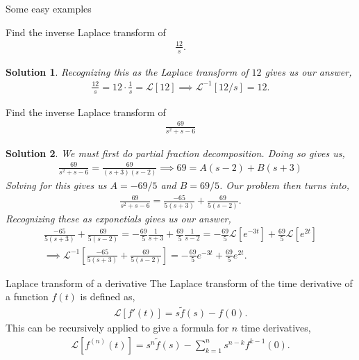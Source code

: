 \documentclass[11pt]{article}
\newtheorem*{solution}{Solution}
\theoremstyle{mystyle}
\begin{document}
\begin{psexample}{Some easy examples}{}
    \begin{hwproblem}
        Find the inverse Laplace transform of
        \begin{align*}
            \frac{12}{s}.
        \end{align*}
    \end{hwproblem}
    \begin{solution}
        Recognizing this as the Laplace transform of
        $12$ gives us our answer,
        \begin{align*}
            \frac{12}{s} = 12 \cdot \frac{1}{s} = \mathcal{L}[12] \implies \mathcal{L}^{-1}[12/s] = 12.
        \end{align*}
    \end{solution}
    \begin{hwproblem}
        Find the inverse Laplace transform of
        \begin{align*}
            \frac{69}{s^2 + s - 6}
        \end{align*}
    \end{hwproblem}
    \begin{solution}
        We must first do partial fraction decomposition.
        Doing so gives us,
        \begin{align*}
            \frac{69}{s^2 + s - 6} = \frac{69}{(s + 3)(s - 2)} \implies 69 = A(s - 2) + B(s + 3)
        \end{align*}
        Solving for this gives us $A = -69/5$ and $B = 69/5$.
        Our problem then turns into,
        \begin{align*}
            \frac{69}{s^2 + s - 6} = \frac{-65}{5(s + 3)} + \frac{69}{5(s - 2)}.
        \end{align*}
        Recognizing these as exponetials gives us our answer,
        \begin{align*}
            \frac{-65}{5(s + 3)} + \frac{69}{5(s - 2)} = - \frac{69}{5} \frac{1}{s + 3} + \frac{69}{5} \frac{1}{s - 2} = - \frac{69}{5} \mathcal{L}[e^{-3t}] + \frac{69}{5} \mathcal{L}[e^{2t}]\\
            \implies
            \mathcal{L}^{-1}\left[ \frac{-65}{5(s + 3)} + \frac{69}{5(s - 2)} \right] = - \frac{69}{5} e^{-3t} + \frac{69}{5} e^{2t}.
        \end{align*}
    \end{solution}
\end{psexample}

\begin{psidea}{Laplace transform of a derivative}{}
    The Laplace transform of the time derivative
    of a function $f(t)$ is defined as,
    \begin{align*}
        \mathcal{L}[f'(t)] = s\tilde{f}(s) - f(0).
    \end{align*}
    This can be recursively applied to give a formula
    for $n$ time derivatives,
    \begin{align*}
        \mathcal{L}[f^{(n)}(t)] = s^n \tilde{f}(s) - \sum_{k = 1}^{n} s^{n - k} f^{k - 1}(0).
    \end{align*}
\end{psidea}
\end{document}
